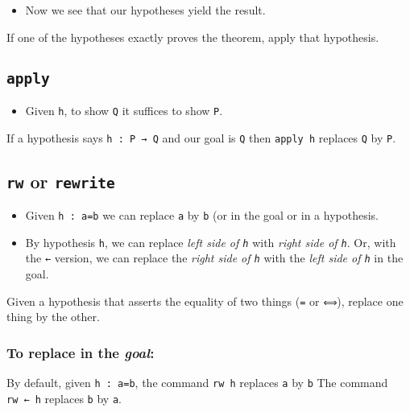 \begin{itemize}
\tightlist
\item
  Now we see that our hypotheses yield the result.
\end{itemize}

If one of the hypotheses exactly proves the theorem, apply that
hypothesis.

\hypertarget{apply}{%
\subsection{\texorpdfstring{\texttt{apply}}{apply}}\label{apply}}

\begin{itemize}
\tightlist
\item
  Given \texttt{h}, to show \texttt{Q} it suffices to show \texttt{P}.
\end{itemize}

If a hypothesis says \texttt{h\ :\ P\ →\ Q} and our goal is \texttt{Q}
then \texttt{apply\ h} replaces \texttt{Q} by \texttt{P}.

\hypertarget{rw-or-rewrite}{%
\subsection{\texorpdfstring{\texttt{rw} or
\texttt{rewrite}}{rw or rewrite}}\label{rw-or-rewrite}}

\begin{itemize}
\item
  Given \texttt{h\ :\ a=b} we can replace \texttt{a} by \texttt{b} (or
  in the goal or in a hypothesis.
\item
  By hypothesis \texttt{h}, we can replace \emph{left side of
  \texttt{h}} with \emph{right side of \texttt{h}}. Or, with the
  \texttt{←} version, we can replace the \emph{right side of \texttt{h}}
  with the \emph{left side of \texttt{h}} in the goal.
\end{itemize}

Given a hypothesis that asserts the equality of two things (\texttt{=}
or \texttt{⟺}), replace one thing by the other.

\hypertarget{to-replace-in-the-goal}{%
\subsubsection{\texorpdfstring{To replace in the
\emph{goal}:}{To replace in the goal:}}\label{to-replace-in-the-goal}}

By default, given \texttt{h\ :\ a=b}, the command \texttt{rw\ h}
replaces \texttt{a} by \texttt{b} The command \texttt{rw\ ←\ h} replaces
\texttt{b} by \texttt{a}.


